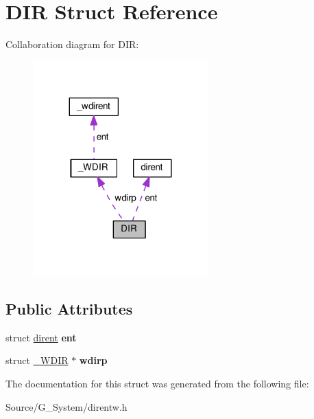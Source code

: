 \hypertarget{structDIR}{}\section{D\+IR Struct Reference}
\label{structDIR}


Collaboration diagram for D\+IR\+:\nopagebreak
\begin{figure}[H]
\begin{center}
\leavevmode
\includegraphics[width=191pt]{structDIR__coll__graph}
\end{center}
\end{figure}
\subsection*{Public Attributes}
\begin{DoxyCompactItemize}
\item 
struct \hyperlink{structdirent}{dirent} {\bfseries ent}\hypertarget{structDIR_a59e9f5211cbb2f8e5b2807ccfdd2a7fc}{}\label{structDIR_a59e9f5211cbb2f8e5b2807ccfdd2a7fc}

\item 
struct \hyperlink{struct__WDIR}{\+\_\+\+W\+D\+IR} $\ast$ {\bfseries wdirp}\hypertarget{structDIR_a29362d4a3d7f809d0f5418b26cac5d41}{}\label{structDIR_a29362d4a3d7f809d0f5418b26cac5d41}

\end{DoxyCompactItemize}


The documentation for this struct was generated from the following file\+:\begin{DoxyCompactItemize}
\item 
Source/\+G\+\_\+\+System/direntw.\+h\end{DoxyCompactItemize}
